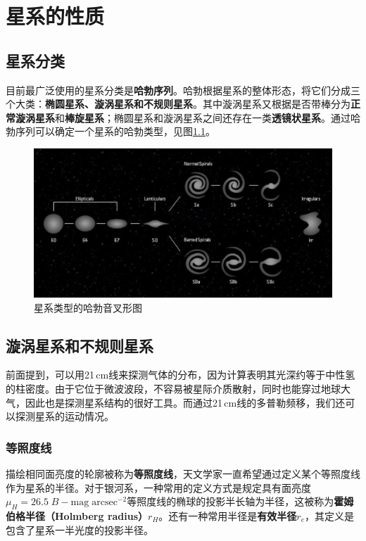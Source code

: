 \chapter{星系的性质}
\section{星系分类}
目前最广泛使用的星系分类是\textbf{哈勃序列}。哈勃根据星系的整体形态，将它们分成三个大类：\textbf{椭圆星系、漩涡星系和不规则星系}。其中漩涡星系又根据是否带棒分为\textbf{正常漩涡星系}和\textbf{棒旋星系}；椭圆星系和漩涡星系之间还存在一类\textbf{透镜状星系}。通过哈勃序列可以确定一个星系的哈勃类型，见图\ref{fig:hubblesequence}。

\begin{figure}[hbt]
  \centering
  \includegraphics[width=12cm]{chapters/25/fork}
  \caption{星系类型的哈勃音叉形图}
  \label{fig:hubblesequence}
\end{figure}

\section{漩涡星系和不规则星系}
前面提到，可以用21\,cm线来探测气体的分布，因为计算表明其光深约等于中性氢的柱密度。由于它位于微波波段，不容易被星际介质散射，同时也能穿过地球大气，因此也是探测星系结构的很好工具。而通过21\,cm线的多普勒频移，我们还可以探测星系的运动情况。

\subsection{等照度线}
描绘相同面亮度的轮廓被称为\textbf{等照度线}，天文学家一直希望通过定义某个等照度线作为星系的半径。对于银河系，一种常用的定义方式是规定具有面亮度$\mu_H=26.5\;B-\mathrm{mag\;arcsec^{-2}}$等照度线的椭球的投影半长轴为半径，这被称为\textbf{霍姆伯格半径（Holmberg radius）}$r_H$。还有一种常用半径是\textbf{有效半径}$r_e$，其定义是包含了星系一半光度的投影半径。

